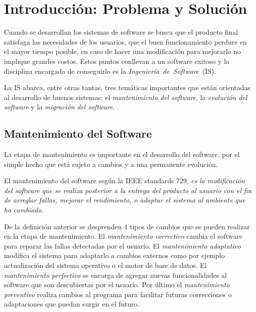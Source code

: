 \documentclass[a4paper,12pt]{report}
\begin{document}

\chapter{Introducción: Problema y Solución}

Cuando se desarrollan los sistemas de software se busca que el producto final satisfaga las necesidades de los usuarios, que el buen funcionamiento perdure en el mayor tiempo posible, en caso de hacer una modificación para mejorarlo no implique grandes costos. Estos puntos conllevan a un software exitoso y la disciplina encargada de conseguirlo es la \mbox{\textit{Ingeniería de Software} (IS).}

La IS abarca, entre otras tantas, tres temáticas importantes que están orientadas al desarrollo de buenos sistemas: el \textit{mantenimiento del software}, la \textit{evolución del software} y la \textit{migración del software}. 

\section{Mantenimiento del Software}

La etapa de mantenimiento es importante en el desarrollo del software, por el simple hecho que está sujeto a cambios y a una permanente \mbox{evolución\cite{PFT02}.}

El mantenimiento del software según la IEEE standards 729, \textit{es la mo\-dificación del software que se realiza posterior a la entrega del producto al usuario con el fin de arreglar fallas, mejorar el rendimiento, o adaptar el sistema al ambiente que ha cambiado.}

De la definición anterior se desprenden 4 tipos de cambios que se pueden realizar en la etapa de mantenimiento. El \textit{mantenimiento correctivo} cambia el software para reparar las fallas detectadas por el usuario. El \textit{mantenimiento adaptativo} modifica el sistema para adaptarlo a cambios externos como por ejemplo actualización del sistema operativo o el motor de base de datos. El \textit{ mantenimiento perfectivo} se encarga de agregar nuevas funcionalidades al software que son descubiertas por el usuario. Por último el \textit{mantenimiento preventivo} realiza cambios al programa para facilitar futuras correcciones o adaptaciones que puedan surgir en el futuro\cite{RSPMGH02}.
\end{document}
